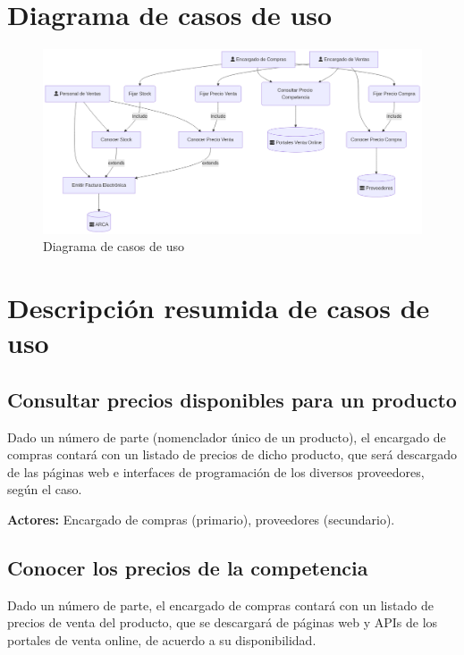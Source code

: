 \pagebreak 

\section{Diagrama de casos de uso}

\begin{figure}[H]
	\vspace{20pt}
	\centering
	\vspace{15pt}
	\includegraphics[width=\textwidth]{img/01-diagrama-casos-uso}
	\caption{Diagrama de casos de uso}
	\vspace{15pt}
\end{figure}

\pagebreak

\section{Descripción resumida de casos de uso}

\subsection{Consultar precios disponibles para un producto}

Dado un número de parte (nomenclador único de un producto),
el encargado de compras contará con un listado de precios de dicho producto,
que será descargado de las páginas web e interfaces de programación de los diversos proveedores,
según el caso.

\textbf{Actores:} Encargado de compras (primario), proveedores (secundario).

\subsection{Conocer los precios de la competencia}

Dado un número de parte,
el encargado de compras contará con un listado de precios de venta del producto,
que se descargará de páginas web y APIs de los portales de venta online,
de acuerdo a su disponibilidad.

